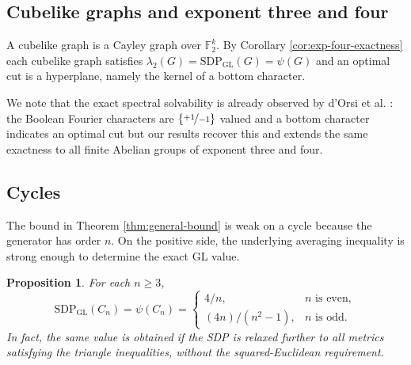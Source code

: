 \documentclass[11pt]{article}
\newtheorem{proposition}[theorem]{Proposition}
\theoremstyle{definition}
\theoremstyle{remark}
\newcommand{\gl}{\operatorname{SDP_{GL}}}
\begin{document}
\subsection{Cubelike graphs and exponent three and four}
A cubelike graph is a Cayley graph over $\mathbb{F}_2^k$. By Corollary \ref{cor:exp-four-exactness} each cubelike graph satisfies $\lambda_2(G)= \gl(G)= \psi(G)$ and an optimal cut is a hyperplane, namely the kernel of a bottom character.

We note that the  exact spectral solvability is already observed by d’Orsi et al. \cite{dorsiaetall25}: the Boolean Fourier characters are $\{\nicefrac{+1}{-1}\}$ valued and a bottom character indicates an optimal cut but our results recover this and extends the same exactness to all finite Abelian groups of exponent three and four.



\subsection{Cycles}

The  bound in Theorem \ref{thm:general-bound} is weak on a cycle because the generator has order $n$. On the positive side, the underlying averaging inequality is strong enough to determine the exact GL value.

\begin{proposition}
\label{prop:cycle-exact}
For each $n\geq 3$,
\begin{equation}\label{eq:cycle-exact}
  \gl(C_n)=\psi(C_n)
  =
  \begin{cases}
    4/n,& n \text{ is even},\\[6pt]
    (4n)/(n^2-1),&n\text{ is odd}.
  \end{cases}
\end{equation}
In fact, the same value is obtained if the SDP is relaxed further to all metrics satisfying the triangle inequalities, without the squared-Euclidean requirement.
\end{proposition}
\end{document}
